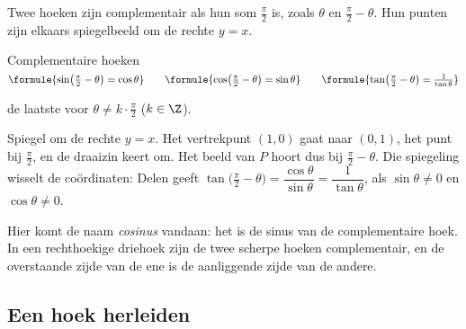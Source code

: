 Twee hoeken zijn complementair als hun som $\frac{\pi}{2}$ is, zoals $\theta$ en $\frac{\pi}{2} - \theta$. Hun punten zijn elkaars spiegelbeeld om de rechte $y = x$.

\begin{theorie}
\begin{stelling}{Complementaire hoeken}
\qquad $\formule{\sin\bigl(\tfrac{\pi}{2} - \theta\bigr) = \cos\theta} \qquad \formule{\cos\bigl(\tfrac{\pi}{2} - \theta\bigr) = \sin\theta} \qquad \formule{\tan\bigl(\tfrac{\pi}{2} - \theta\bigr) = \frac{1}{\tan\theta}}$

\vspace{1mm}
de laatste voor $\theta \neq k \cdot \frac{\pi}{2}$ ($k \in \Z$).
\end{stelling}
\begin{bewijs}
Spiegel om de rechte $y = x$. Het vertrekpunt $(1, 0)$ gaat naar $(0, 1)$, het punt bij $\frac{\pi}{2}$, en de draaizin keert om. Het beeld van $P$ hoort dus bij $\frac{\pi}{2} - \theta$. Die spiegeling wisselt de coördinaten:
Delen geeft $\tan\bigl(\frac{\pi}{2} - \theta\bigr) = \dfrac{\cos\theta}{\sin\theta} = \dfrac{1}{\tan\theta}$, als $\sin\theta \neq 0$ en $\cos\theta \neq 0$.
\end{bewijs}
\end{theorie}

Hier komt de naam \textit{cosinus} vandaan: het is de sinus van de complementaire hoek. In een rechthoekige driehoek zijn de twee scherpe hoeken complementair, en de overstaande zijde van de ene is de aanliggende zijde van de andere.


\begin{oefeningen}
\end{oefeningen}

\subsection{Een hoek herleiden}

